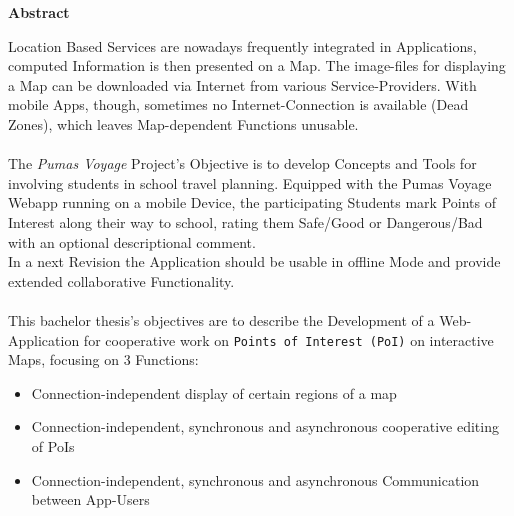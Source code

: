   \vspace{2cm}

\begin{center}
\textbf{Abstract}
\end{center}

\noindent
Location Based Services are nowadays frequently integrated in Applications, computed Information is then presented on a Map. The image-files for displaying a Map can be downloaded via Internet from various Service-Providers. With mobile Apps, though, sometimes no Internet-Connection is available (Dead Zones), which leaves Map-dependent Functions unusable.\\ \\
The \textit{Pumas Voyage} Project's Objective is to develop Concepts and Tools for involving students in school travel planning. Equipped with the Pumas Voyage Webapp running on a mobile Device, the participating Students mark Points of Interest along their way to school, rating them Safe/Good or Dangerous/Bad with an optional descriptional comment.\\
In a next Revision the Application should be usable in offline Mode and provide extended collaborative Functionality.\\ \\
This bachelor thesis's objectives are to describe the Development of a Web-Application for cooperative work on \texttt{Points of Interest (PoI)} on interactive Maps, focusing on 3 Functions:
\begin{itemize}
\item Connection-independent display of certain regions of a map
\item Connection-independent, synchronous and asynchronous cooperative editing of PoIs
\item Connection-independent, synchronous and asynchronous Communication between App-Users
\end{itemize}
